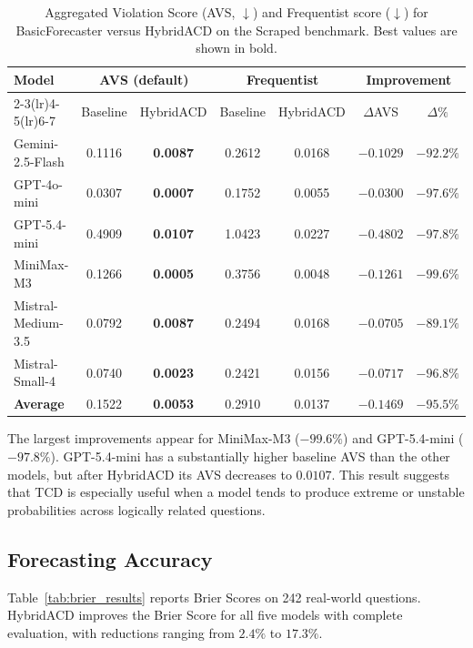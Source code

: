 \documentclass[pdflatex,sn-mathphys-num]{sn-jnl}
\begin{document}
\begin{table}[h]
\caption{Aggregated Violation Score (AVS, $\downarrow$) and Frequentist score ($\downarrow$)
  for BasicForecaster versus HybridACD on the Scraped benchmark. Best values are shown in bold.}
\label{tab:avs_results}
\begin{tabular}{@{}lcccccc@{}}
\toprule
\multirow{2}{*}{Model} &
  \multicolumn{2}{c}{AVS (default)} &
  \multicolumn{2}{c}{Frequentist} &
  \multicolumn{2}{c}{Improvement} \\
\cmidrule(lr){2-3}\cmidrule(lr){4-5}\cmidrule(lr){6-7}
& Baseline & HybridACD & Baseline & HybridACD & $\Delta$AVS & $\Delta\%$ \\
\midrule
Gemini-2.5-Flash      & 0.1116 & \textbf{0.0087} & 0.2612 & 0.0168 & $-0.1029$ & $-92.2\%$ \\
GPT-4o-mini           & 0.0307 & \textbf{0.0007} & 0.1752 & 0.0055 & $-0.0300$ & $-97.6\%$ \\
GPT-5.4-mini          & 0.4909 & \textbf{0.0107} & 1.0423 & 0.0227 & $-0.4802$ & $-97.8\%$ \\
MiniMax-M3            & 0.1266 & \textbf{0.0005} & 0.3756 & 0.0048 & $-0.1261$ & $-99.6\%$ \\
Mistral-Medium-3.5    & 0.0792 & \textbf{0.0087} & 0.2494 & 0.0168 & $-0.0705$ & $-89.1\%$ \\
Mistral-Small-4       & 0.0740 & \textbf{0.0023} & 0.2421 & 0.0156 & $-0.0717$ & $-96.8\%$ \\
\midrule
\textbf{Average}      & 0.1522 & \textbf{0.0053} & 0.2910 & 0.0137 & $-0.1469$ & $-95.5\%$ \\
\bottomrule
\end{tabular}
\end{table}

The largest improvements appear for MiniMax-M3 ($-99.6\%$) and GPT-5.4-mini ($-97.8\%$). GPT-5.4-mini has a substantially higher baseline AVS than the other models, but after HybridACD its AVS decreases to $0.0107$. This result suggests that TCD is especially useful when a model tends to produce extreme or unstable probabilities across logically related questions.

\subsection{Forecasting Accuracy}

Table~\ref{tab:brier_results} reports Brier Scores on 242 real-world questions. HybridACD improves the Brier Score for all five models with complete evaluation, with reductions ranging from $2.4\%$ to $17.3\%$.
\end{document}
